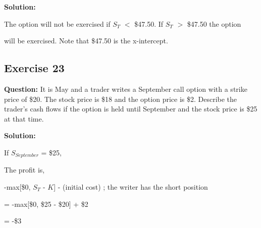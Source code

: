\documentclass{article}
\begin{document}
\textbf{Solution:} 


The option will not be exercised if $S_T$ $<$ \$47.50. If $S_T$ $>$ \$47.50 the option 

will be exercised. Note that \$47.50 is the x-intercept.

\subsection*{Exercise 23}

\textbf{Question:} It is May and a trader writes a September call option with a strike price of \$20. The stock price is \$18 and the option price is \$2. Describe the trader’s cash flows if the option is held until September and the
stock price is \$25 at that time.

\textbf{Solution:} 

If $S_{September}$ = \$25,

\vspace{\baselineskip}

The profit is,

\vspace{\baselineskip}

-max[\$0, $S_T$ - $K$] - (initial cost) ; the writer has the short position 

\vspace{\baselineskip}

= -max[\$0, \$25 - \$20] + \$2

\vspace{\baselineskip}

= -\$3

\vspace{\baselineskip}
\end{document}
